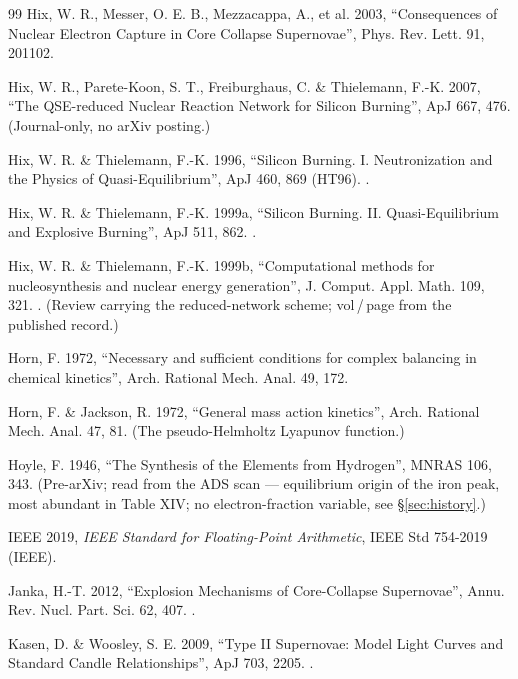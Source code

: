 \begin{thebibliography}{99}
Hix, W. R., Messer, O. E. B., Mezzacappa, A., et al. 2003, ``Consequences of
Nuclear Electron Capture in Core Collapse Supernovae'', Phys. Rev. Lett. 91,
201102.

Hix, W. R., Parete-Koon, S. T., Freiburghaus, C. \& Thielemann, F.-K. 2007,
``The QSE-reduced Nuclear Reaction Network for Silicon Burning'', ApJ 667, 476.
(Journal-only, no arXiv posting.)

Hix, W. R. \& Thielemann, F.-K. 1996, ``Silicon Burning. I. Neutronization and
the Physics of Quasi-Equilibrium'', ApJ 460, 869 (HT96).
.

Hix, W. R. \& Thielemann, F.-K. 1999a, ``Silicon Burning. II. Quasi-Equilibrium
and Explosive Burning'', ApJ 511, 862. .

Hix, W. R. \& Thielemann, F.-K. 1999b, ``Computational methods for
nucleosynthesis and nuclear energy generation'', J. Comput. Appl. Math. 109,
321. . (Review carrying the reduced-network scheme;
vol\,/\,page from the published record.)

Horn, F. 1972, ``Necessary and sufficient conditions for complex balancing in
chemical kinetics'', Arch. Rational Mech. Anal. 49, 172.

Horn, F. \& Jackson, R. 1972, ``General mass action kinetics'', Arch. Rational
Mech. Anal. 47, 81. (The pseudo-Helmholtz Lyapunov function.)

Hoyle, F. 1946, ``The Synthesis of the Elements from Hydrogen'', MNRAS 106,
343. (Pre-arXiv; read from the ADS scan --- equilibrium origin of the iron
peak,  most abundant in Table XIV; no electron-fraction variable,
see \S\ref{sec:history}.)

IEEE 2019, \emph{IEEE Standard for Floating-Point Arithmetic}, IEEE Std
754-2019 (IEEE).

Janka, H.-T. 2012, ``Explosion Mechanisms of Core-Collapse Supernovae'', Annu.
Rev. Nucl. Part. Sci. 62, 407. .

Kasen, D. \& Woosley, S. E. 2009, ``Type II Supernovae: Model Light Curves and
Standard Candle Relationships'', ApJ 703, 2205. .


\end{thebibliography}
